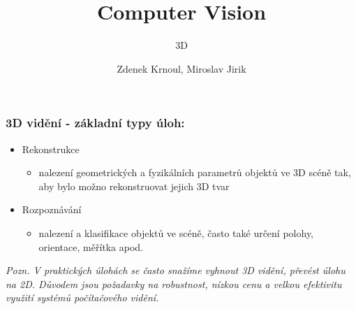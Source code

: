 \title{Computer Vision}
\subtitle{3D}
\author{Zdenek Krnoul, Miroslav Jirik}

\date{} %



\begingroup 
{}

\begin{frame}
	\titlepage
\end{frame}

\addtocounter{framenumber}{-1}
\expandafter\def\expandafter\insertshorttitle\expandafter{%
	\insertshorttitle \hfill \insertframenumber\,/\,\inserttotalframenumber
}



\begin{frame}
\frametitle{3D vidění - základní typy úloh:}
\begin{itemize}
	\item Rekonstrukce
    \begin{itemize}
    \item nalezení  geometrických  a  fyzikálních  parametrů  objektů  ve  3D scéně  tak,  aby  bylo  možno rekonstruovat jejich 3D tvar
    \end{itemize}
    \item Rozpoznávání
    \begin{itemize}
    \item nalezení a klasifikace objektů ve scéně, často také určení polohy, orientace, měřítka apod.
    \end{itemize}
\end{itemize}
\textit{Pozn. V praktických úlohách se často snažíme vyhnout 3D vidění, převést úlohu na 2D. Důvodem jsou požadavky na robustnost, nízkou cenu a velkou efektivitu využití systémů počítačového vidění.}
\end{frame}

